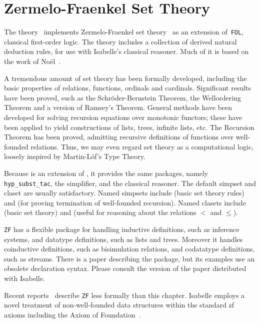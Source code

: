 \chapter{Zermelo-Fraenkel Set Theory}

The theory~ implements Zermelo-Fraenkel set
theory~\cite{halmos60,suppes72} as an extension of~\texttt{FOL}, classical
first-order logic.  The theory includes a collection of derived natural
deduction rules, for use with Isabelle's classical reasoner.  Much
of it is based on the work of No\"el~\cite{noel}.

A tremendous amount of set theory has been formally developed, including
the basic properties of relations, functions, ordinals and cardinals.
Significant results have been proved, such as the Schr\"oder-Bernstein
Theorem, the Wellordering Theorem and a version of Ramsey's Theorem.
General methods have been developed for solving recursion equations over
monotonic functors; these have been applied to yield constructions of
lists, trees, infinite lists, etc.  The Recursion Theorem has been proved,
admitting recursive definitions of functions over well-founded relations.
Thus, we may even regard set theory as a computational logic, loosely
inspired by Martin-L\"of's Type Theory.

Because {\ZF} is an extension of {\FOL}, it provides the same
packages, namely \texttt{hyp_subst_tac}, the simplifier, and the
classical reasoner.  The default simpset and claset are usually
satisfactory.  Named simpsets include  (basic set
theory rules) and  (for proving termination of
well-founded recursion).  Named clasets include 
(basic set theory) and  (useful for reasoning about
the relations $<$ and $\le$).

\texttt{ZF} has a flexible package for handling inductive definitions,
such as inference systems, and datatype definitions, such as lists and
trees.  Moreover it handles coinductive definitions, such as
bisimulation relations, and codatatype definitions, such as streams.
There is a paper \cite{paulson-CADE} describing the package, but its
examples use an obsolete declaration syntax.  Please consult the
version of the paper distributed with Isabelle.

Recent reports~\cite{paulson-set-I,paulson-set-II} describe \texttt{ZF} less
formally than this chapter.  Isabelle employs a novel treatment of
non-well-founded data structures within the standard {\sc zf} axioms including
the Axiom of Foundation~\cite{paulson-final}.


